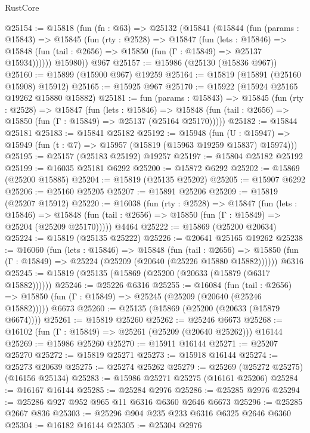 \begin{lexlean}{RustCore}
\begin{coremodule}
@25154 := @15818
    (fun (fn : @63) =>
    @25132
      (@15841
        (@15844
          (fun (params : @15843) =>
          @15845
            (fun (rty : @2528) =>
            @15847
              (fun (lets : @15846) =>
              @15848 (fun (tail : @2656) => @15850 (fun (Γ : @15849) => @25137 @15934))))))
        @15980))
    @967
@25157 := @15986 (@25130 (@15836 @967))
@25160 := @15899 (@15900 @967) @19259
@25164 := @15819 (@15891 (@25160 @15908) @15912)
@25165 := @15925 @967
@25170 := @15922 (@15924 @25165 @19262 @15880 @15882)
@25181 := fun (params : @15843) =>
  @15845
    (fun (rty : @2528) =>
    @15847
      (fun (lets : @15846) =>
      @15848 (fun (tail : @2656) => @15850 (fun (Γ : @15849) => @25137 (@25164 @25170)))))
@25182 := @15844 @25181
@25183 := @15841 @25182
@25192 := @15948
    (fun (U : @15947) => @15949 (fun (t : @7) => @15957 (@15819 (@15963 @19259 @15837) @15974)))
@25195 := @25157 (@25183 @25192) @19257
@25197 := @15804 @25182 @25192
@25199 := @16035 @25181 @6292
@25200 := @15872 @6292
@25202 := @15869 (@25200 @15885)
@25204 := @15819 (@25135 @25202)
@25205 := @15907 @6292
@25206 := @25160 @25205
@25207 := @15891 @25206
@25209 := @15819 (@25207 @15912)
@25220 := @16038
    (fun (rty : @2528) =>
    @15847
      (fun (lets : @15846) =>
      @15848 (fun (tail : @2656) => @15850 (fun (Γ : @15849) => @25204 (@25209 @25170)))))
    @4464
@25222 := @15869 (@25200 @20634)
@25224 := @15819 (@25135 @25222)
@25226 := @20641 @25165 @19262
@25238 := @16060
    (fun (lets : @15846) =>
    @15848
      (fun (tail : @2656) =>
      @15850 (fun (Γ : @15849) => @25224 (@25209 (@20640 (@25226 @15880 @15882))))))
    @6316
@25245 := @15819 (@25135 (@15869 (@25200 (@20633 (@15879 (@6317 @15882))))))
@25246 := @25226 @6316
@25255 := @16084
    (fun (tail : @2656) => @15850 (fun (Γ : @15849) => @25245 (@25209 (@20640 (@25246 @15882)))))
    @6673
@25260 := @25135 (@15869 (@25200 (@20633 (@15879 @6674))))
@25261 := @15819 @25260
@25262 := @25246 @6673
@25268 := @16102 (fun (Γ : @15849) => @25261 (@25209 (@20640 @25262))) @16144
@25269 := @15986 @25260
@25270 := @15911 @16144
@25271 := @25207 @25270
@25272 := @15819 @25271
@25273 := @15918 @16144
@25274 := @25273 @20639
@25275 := @25274 @25262
@25279 := @25269 (@25272 @25275) (@16156 @25134)
@25283 := @15986 @25271 @25275 (@16161 @25206)
@25284 := @16167 @16144
@25285 := @25284 @2976
@25286 := @25285 @2976
@25294 := @25286 @927 @952 @965 @11 @6316 @6360 @2646 @6673
@25296 := @25285 @2667 @836
@25303 := @25296 @904 @235 @233 @6316 @6325 @2646 @6360
@25304 := @16182 @16144
@25305 := @25304 @2976

\end{coremodule}
\end{lexlean}
